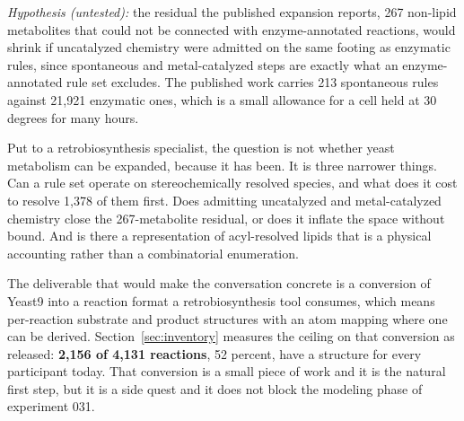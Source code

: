 \textit{Hypothesis (untested):} the residual the published expansion reports, 267 non-lipid
metabolites that could not be connected with enzyme-annotated reactions, would shrink if
uncatalyzed chemistry were admitted on the same footing as enzymatic rules, since spontaneous
and metal-catalyzed steps are exactly what an enzyme-annotated rule set excludes. The
published work carries 213 spontaneous rules against 21{,}921 enzymatic ones, which is a small
allowance for a cell held at 30 degrees for many hours.

Put to a retrobiosynthesis specialist, the question is not whether yeast metabolism can be
expanded, because it has been. It is three narrower things. Can a rule set operate on
stereochemically resolved species, and what does it cost to resolve 1{,}378 of them first.
Does admitting uncatalyzed and metal-catalyzed chemistry close the 267-metabolite residual, or
does it inflate the space without bound. And is there a representation of acyl-resolved lipids
that is a physical accounting rather than a combinatorial enumeration.

The deliverable that would make the conversation concrete is a conversion of Yeast9 into a
reaction format a retrobiosynthesis tool consumes, which means per-reaction substrate and
product structures with an atom mapping where one can be derived. Section~\ref{sec:inventory}
measures the ceiling on that conversion as released: \textbf{2{,}156 of 4{,}131 reactions},
52 percent, have a structure for every participant today. That conversion is a small piece of
work and it is the natural first step, but it is a side quest and it does not block the
modeling phase of experiment 031.
